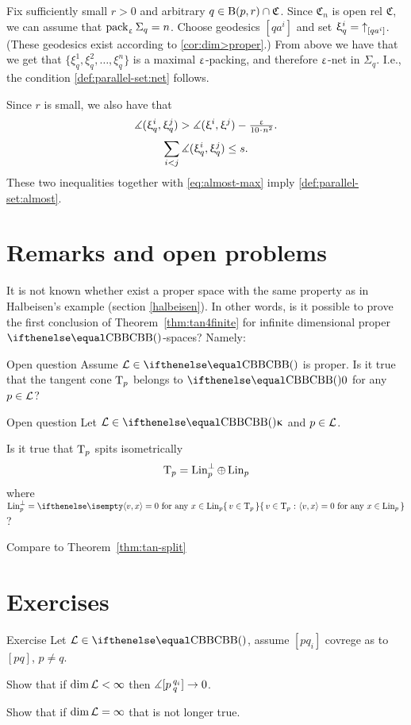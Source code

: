 Fix sufficiently small $r>0$
and arbitrary $q\in \oBall(p,r)\cap \mathfrak{C}$.
Since $\mathfrak{C}_n$ is open rel $\mathfrak{C}$,
we can assume that $\mathop{\rm pack}\nolimits_\upvarepsilon\Sigma_q=n$.
Choose
 geodesics $[qa^i]$ 
and set $\upxi^i_q={\uparrow}_{[{q}{a^i}]}$.
(These geodesics exist according to \ref{cor:dim>proper}.)
From above we have that
we get that $\{\xi^1_q,\xi^2_q,\dots,\xi^n_q\}$ is a maximal $\upvarepsilon$-packing, and therefore $\upvarepsilon$-net in $\Sigma_q$.
I.e., the condition \ref{def:parallel-set:net} follows.

Since $r$ is small, we also have that
\[\mangle(\xi^i_q,\xi^j_q)>\mangle(\xi^i,\xi^j)-\tfrac{\eps}{10\cdot n^2}.\] 
\[\sum_{i<j}\mangle(\xi^i_q,\xi^j_q)\le s.\]
These two inequalities together with \ref{eq:almost-max} imply \ref{def:parallel-set:almost}.
\qeds




\section{Remarks and open problems}

It is not known whether exist a proper space with the same property as in Halbeisen's example (section \ref{halbeisen}).
In other words, 
is it possible to  prove the first conclusion of Theorem~\ref{thm:tan4finite} 
for infinite dimensional proper $\Alex{}{}$-spaces?
Namely:

\begin{thm}{Open question}\label{open:Halb-proper}
Assume $\spc{L}\in\Alex{}{}$ is proper. 
Is it true that the tangent cone $\text{\rm T}_p$ belongs to $\Alex{}{0}$ for any $p\in\spc{L}$?
\end{thm}

\begin{thm}{Open question}\label{open:split-inf-dim}
Let $\spc{L}\in\Alex{}{\kappa}$ and $p\in \spc{L}$.

Is it true that $\text{\rm T}_p$ spits isometrically
\[\text{\rm T}_p=\mathop{\rm Lin}\nolimits_p^\perp\oplus\mathop{\rm Lin}\nolimits_p\]
where 
$\Lin_p^\perp=\set{v\in \T_p}{\<v,x\>=0\ \text{for any}\ x\in\Lin_p}$?
\end{thm}

Compare to Theorem~\ref{thm:tan-split}


\section{Exercises}

\begin{thm}{Exercise}
Let $\spc{L}\in\Alex{}{}$, assume $[pq_i]$ covrege as to $[pq]$, $p\not=q$. 

Show that if $\mathop{\rm dim}\nolimits\mathcal{L}<\infty$ then $\mangle\hinge p{q_i}{q}\to0$.

Show that if $\mathop{\rm dim}\nolimits\mathcal{L}=\infty$ that is not longer true.
\end{thm}




